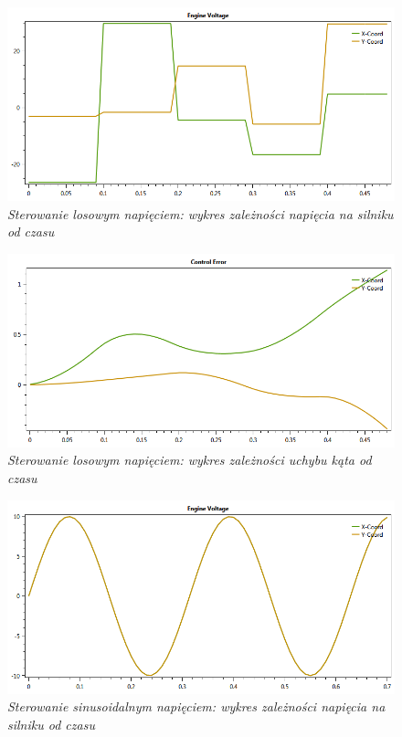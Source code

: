 \documentclass[12pt, oneside]{report}
\theoremstyle{definition}
\begin{document}
\begin{figure}[H]
	\centering
		\includegraphics[width = 350pt]{RandomEV} 
		\caption{\textit{Sterowanie losowym napięciem: wykres zależności napięcia na silniku od czasu}}
		\label{plot:RandomEV}
\end{figure}

\begin{figure}[H]
	\centering
		\includegraphics[width = 350pt]{RandomCE} 
		\caption{\textit{Sterowanie losowym napięciem: wykres zależności uchybu kąta od czasu}}
		\label{plot:RandomCE}
\end{figure}

\begin{figure}[H]
	\centering
		\includegraphics[width = 350pt]{SinusoidalEV} 
		\caption{\textit{Sterowanie sinusoidalnym napięciem: wykres zależności napięcia na silniku od czasu}}
		\label{plot:SinusoidalEV}
\end{figure}
\end{document}
